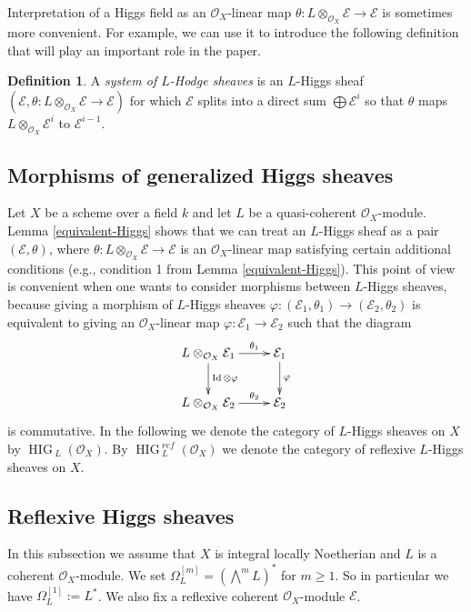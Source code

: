 \documentclass[12pt]{article}
\theoremstyle{plain}
\theoremstyle{definition}
\newtheorem{Definition}[Thm]{Definition}
\theoremstyle{remark}
\newcommand{\cE}{{\mathcal E}}
\newcommand{\cO}{{\mathcal O}}
\newcommand{\Hig}{{\mathop{\operatorname{HIG}\, }}}
\newcommand{\id}{\mathop{\rm Id}}
\begin{document}
\medskip

Interpretation of a Higgs field as an $\cO_X$-linear map $\theta : L\otimes _{\cO_X} \cE\to \cE$ is sometimes more convenient. For example, we can use it to introduce the following definition that will play an important role in the paper.

\begin{Definition}
	A \emph{system of $L$-Hodge sheaves} is an $L$-Higgs
	sheaf $(\cE, \theta : L\otimes _{\cO_X} \cE \to \cE )$ for which $\cE$ splits into a direct sum $\bigoplus
	\cE^i$ so that $\theta$ maps $L\otimes _{\cO_X} \cE^i$ to $\cE^{i-1}$.
\end{Definition}

\subsection{Morphisms of generalized Higgs sheaves}

Let $X$ be a scheme over a field $k$ and let $L$ be a quasi-coherent $\cO_X$-module. Lemma \ref{equivalent-Higgs}
shows that we can treat an $L$-Higgs sheaf as a pair $(\cE , \theta)$, where $\theta : L\otimes _{\cO_X} \cE\to \cE$ is an $\cO_X$-linear map satisfying certain additional conditions (e.g., condition 1 from Lemma \ref{equivalent-Higgs}).
This point of view is convenient when one wants to consider morphisms between $L$-Higgs sheaves, because 
giving a {morphism of $L$-Higgs sheaves} $\varphi : (\cE _1, \theta _1)\to  (\cE _2, \theta _2) $ is 
equivalent to giving an $\cO_X$-linear map $\varphi: \cE_1\to \cE_2$ such that  the diagram
	$$\xymatrix{L\otimes _{\cO_X} \cE_1\ar[r]^-{\theta_1}\ar[d]^{\id \otimes \varphi}& \cE_1\ar[d]^{\varphi}\\
	L\otimes _{\cO_X} \cE_2\ar[r]^-{\theta_2}&\cE_2\\
}$$
is commutative.
In the following we denote the category of $L$-Higgs sheaves on $X$ by $\Hig _L(\cO_X)$.
By $\Hig^{ref}_L (\cO_X)$ we denote the category of reflexive  $L$-Higgs sheaves on $X$.



\subsection{Reflexive Higgs sheaves}

In this subsection we assume that $X$ is  integral locally Noetherian and  $L$ is a  coherent $\cO_X$-module.
We set $\Omega_L^{[m]}=({\bigwedge}^mL)^*$ for $m\ge 1$. So in particular we have $\Omega_L^{[1]}:=L^*$. We also fix a reflexive coherent $\cO_X$-module $\cE$. 
  
\end{document}
